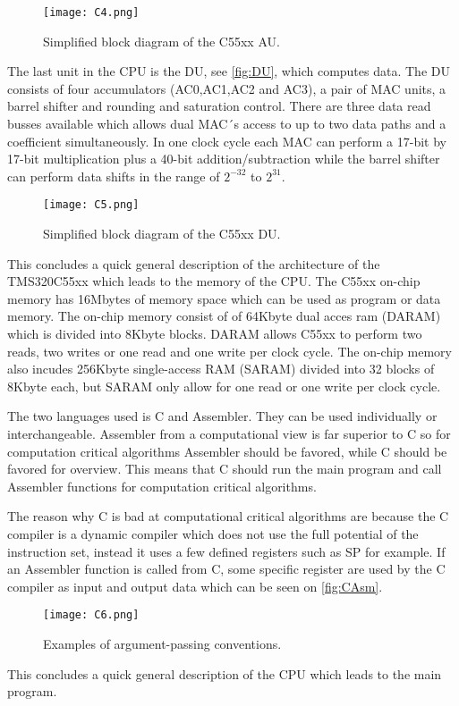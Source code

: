 \begin{figure}[H]
\centering
\texttt{[image: C4.png]}
\caption{Simplified block diagram of the C55xx AU.}
\label{fig:AU}
\end{figure}
The last unit in the CPU is the DU, see \autoref{fig:DU}, which computes data. The DU consists of four accumulators (AC0,AC1,AC2 and AC3), a pair of MAC units, a barrel shifter and rounding and saturation control. There are three data read busses available which allows dual MAC´s access to up to two data paths and a coefficient simultaneously. In one clock cycle each MAC can perform a 17-bit by 17-bit multiplication plus a 40-bit addition/subtraction while the barrel shifter can perform data shifts in the range of $2^{-32}$ to $2^{31}$. 
\begin{figure}[H]
\centering
\texttt{[image: C5.png]}
\caption{Simplified block diagram of the C55xx DU.}
\label{fig:DU}
\end{figure}
This concludes a quick general description of the architecture of the TMS320C55xx which leads to the memory of the CPU. The C55xx on-chip memory has 16Mbytes of memory space which can be used as program or data memory. The on-chip memory consist of of 64Kbyte dual acces ram (DARAM) which is divided into 8Kbyte blocks. DARAM allows C55xx to perform two reads, two writes or one read and one write per clock cycle. The on-chip memory also incudes 256Kbyte single-access RAM (SARAM) divided into 32 blocks of 8Kbyte each, but SARAM only allow for one read or one write per clock cycle.

The two languages used is C and Assembler. They can be used individually or interchangeable. Assembler from a computational view is far superior to C so for computation critical algorithms Assembler should be favored, while C should be favored for overview. This means that C should run the main program and call Assembler functions for computation critical algorithms. 

The reason why C is bad at computational critical algorithms are because the C compiler is a dynamic compiler which does not use the full potential of the instruction set, instead it uses a few defined registers such as SP for example. If an Assembler function is called from C, some specific register are used by the C compiler as input and output data which can be seen on \autoref{fig:CAsm}.
\begin{figure}[H]
\centering
\texttt{[image: C6.png]}
\caption{Examples of argument-passing conventions.}
\label{fig:CAsm}
\end{figure}
This concludes a quick general description of the CPU which leads to the main program.
